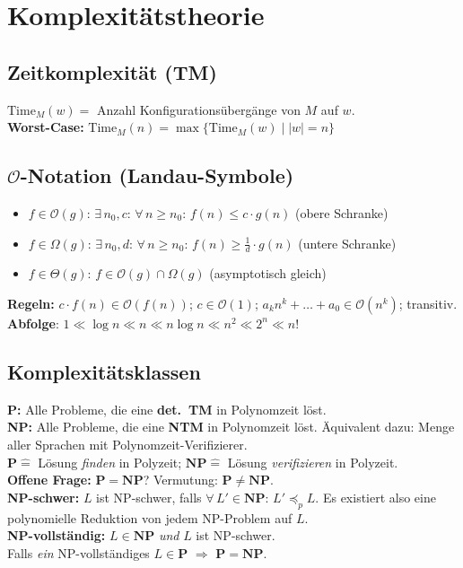 \section{Komplexitätstheorie}

\subsection{Zeitkomplexität (TM)}
$\text{Time}_M(w) =$ Anzahl Konfigurationsübergänge von $M$ auf $w$.\\
\textbf{Worst-Case:} $\text{Time}_M(n) = \max\{\text{Time}_M(w) \mid |w| = n\}$

\subsection{$\mathcal{O}$-Notation (Landau-Symbole)}
\begin{itemize}
    \item $f \in \mathcal{O}(g)$: $\exists\, n_0, c$: $\forall\, n \geq n_0$: $f(n) \leq c \cdot g(n)$ \quad (obere Schranke)
    \item $f \in \Omega(g)$: $\exists\, n_0, d$: $\forall\, n \geq n_0$: $f(n) \geq \frac{1}{d} \cdot g(n)$ \quad (untere Schranke)
    \item $f \in \Theta(g)$: $f \in \mathcal{O}(g) \cap \Omega(g)$ \quad (asymptotisch gleich)
\end{itemize}
\textbf{Regeln:} $c \cdot f(n) \in \mathcal{O}(f(n))$;\; $c \in \mathcal{O}(1)$;\; $a_k n^k + \ldots + a_0 \in \mathcal{O}(n^k)$;\; transitiv. \\
\textbf{Abfolge}: $1 \ll \log n \ll n \ll n \log n \ll n^2 \ll 2^n \ll n!$

\subsection{Komplexitätsklassen}
\textbf{P:} Alle Probleme, die eine \textbf{det.\ TM} in Polynomzeit löst.\\
\textbf{NP:} Alle Probleme, die eine \textbf{NTM} in Polynomzeit löst. Äquivalent dazu: Menge aller Sprachen mit Polynomzeit-Verifizierer.\\
$\mathbf{P} \mathrel{\widehat{=}}$ Lösung \textit{finden} in Polyzeit;\;
$\mathbf{NP} \mathrel{\widehat{=}}$ Lösung \textit{verifizieren} in Polyzeit.\\
\textbf{Offene Frage:} $\mathbf{P} = \mathbf{NP}$? \quad Vermutung: $\mathbf{P} \neq \mathbf{NP}$.\\[3pt]
\textbf{NP-schwer:} $L$ ist NP-schwer, falls $\forall\, L' \in \mathbf{NP}$: $L' \preceq_p L$. Es existiert also eine polynomielle Reduktion von jedem NP-Problem auf $L$.\\
\textbf{NP-vollständig:} $L \in \mathbf{NP}$ \textit{und} $L$ ist NP-schwer.\\
Falls \textit{ein} NP-vollständiges $L \in \mathbf{P}$ $\Rightarrow$ $\mathbf{P} = \mathbf{NP}$.

